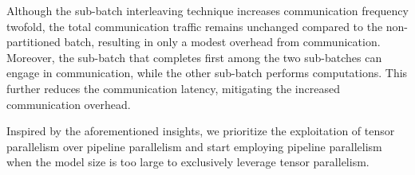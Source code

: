 %
Although the sub-batch interleaving technique increases communication frequency twofold, the total communication traffic remains unchanged compared to the non-partitioned batch, resulting in only a modest overhead from communication.
%
Moreover, the sub-batch that completes first among the two sub-batches can engage in communication, while the other sub-batch performs computations. 
%
This further reduces the communication latency, mitigating the increased communication overhead.
%

%
Inspired by the aforementioned insights, we prioritize the exploitation of tensor parallelism over pipeline parallelism and start employing pipeline parallelism when the model size is too large to exclusively leverage tensor parallelism.
%